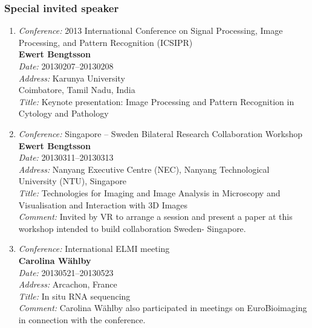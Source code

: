 \subsubsection{Special invited speaker}
\begin{enumerate}
\item 
{\em Conference:} 2013 International Conference on Signal Processing, Image Processing, and Pattern Recognition (ICSIPR)~\\
{\bf Ewert Bengtsson}~\\
{\em Date:} 20130207--20130208~\\
{\em Address:} Karunya University ~\\ 
Coimbatore, Tamil Nadu, India~\\
{\em Title:} Keynote presentation: Image Processing and Pattern Recognition in Cytology and Pathology



\item 
{\em Conference:} Singapore -- Sweden  Bilateral Research Collaboration Workshop~\\
{\bf Ewert Bengtsson}~\\
{\em Date:} 20130311--20130313~\\
{\em Address:} Nanyang Executive Centre (NEC), Nanyang Technological University (NTU), Singapore~\\
{\em Title:} Technologies for Imaging and Image Analysis in Microscopy and Visualisation and Interaction with 3D Images~\\
{\em Comment:} Invited by VR to arrange a session and present a paper at this workshop intended to build collaboration Sweden- Singapore.




\item 
{\em Conference:} International ELMI meeting~\\
{\bf Carolina W\"{a}hlby}~\\
{\em Date:} 20130521--20130523~\\
{\em Address:} Arcachon, France~\\
{\em Title:} In situ RNA sequencing~\\
{\em Comment:} Carolina W\"{a}hlby also participated in meetings on EuroBioimaging in connection with the conference.


\end{enumerate}
